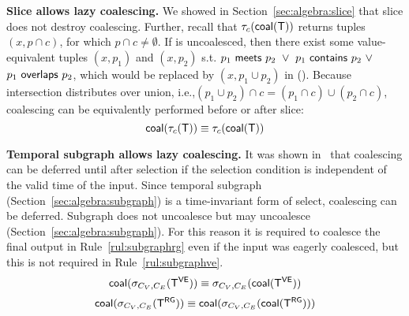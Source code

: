 \eat{\begin{equation}
\cl(\cl(\ttt)) \equiv \cl(\ttt)
\label{rul:twice}
\end{equation}}





{\bf Slice allows lazy coalescing.}  We showed in
Section~\ref{sec:algebra:slice} that slice does not destroy
coalescing.  Further, recall that $\tau_c(\textsf{coal}(\mathsf{T}))$ returns tuples
$(x,p \cap c)$, for which $p \cap c \neq \emptyset$.  If \ttt is
uncoalesced, then there exist some value-equivalent tuples $(x, p_1)$
and $(x, p_2)$
s.t. $p_1~\mathsf{meets}~p_2~\lor~p_1~\mathsf{contains}~p_2~\lor$\\$p_1~\mathsf{overlaps}~p_2$,
which would be replaced by $(x, p_1 \cup p_2)$ in \cl(\ttt).  Because
intersection distributes over union, i.e.,$(p_1 \cup p_2) \cap c =
(p_1 \cap c) \cup (p_2 \cap c)$, coalescing can be equivalently
performed before or after slice: 
\begin{equation}
\textsf{coal}(\tau_c(\mathsf{T})) \equiv \tau_c(\textsf{coal}(\mathsf{T}))
\label{rul:slice}
\end{equation}

{\bf Temporal subgraph allows lazy coalescing.} It was shown
in~\cite{DBLP:conf/vldb/BohlenSS96} that coalescing can be deferred
until after selection if the selection condition is independent of the
valid time of the input. Since temporal subgraph
(Section~\ref{sec:algebra:subgraph}) is a time-invariant form of
select, coalescing can be deferred.  Subgraph does not uncoalesce \tve
but may uncoalesce \trg (Section~\ref{sec:algebra:subgraph}). For this
reason it is required to coalesce the final output in
Rule~\ref{rul:subgraphrg} even if the input was eagerly coalesced, but
this is not required in Rule~\ref{rul:subgraphve}.
\begin{equation}
\textsf{coal}(\sigma_{C_V,C_E}(\mathsf{T^{VE}})) \equiv \sigma_{C_V,C_E}(\textsf{coal}(\mathsf{T^{VE}}))
\label{rul:subgraphve}
\end{equation}
\begin{equation}
\textsf{coal}(\sigma_{C_V,C_E}(\mathsf{T^{RG}})) \equiv \textsf{coal}(\sigma_{C_V,C_E}(\textsf{coal}(\mathsf{T^{RG}})))
\label{rul:subgraphrg}
\end{equation}

